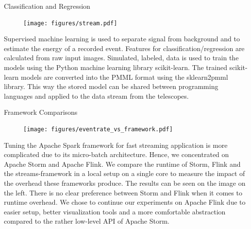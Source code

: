 \begin{multicols}{2}
    \begin{block}[]{Classification and Regression}%
      \begin{multicols}{2}
          \begin{figure}
            \texttt{[image: figures/stream.pdf]}\\
          \end{figure}
        \columnbreak
        Supervised machine learning is used to separate signal from background and to estimate
        the energy of a recorded event. Features for classification/regression are calculated from raw input
        images.
        Simulated, labeled, data is used to train the models using the Python machine learning library scikit-learn\cite{sklearn}.
        The trained scikit-learn models are converted into the PMML\cite{pmml} format using the sklearn2pmml\cite{sklearn2pmml} library.
        This way the stored model can be shared
        between programming languages and applied to the data stream from the telescopes.
      \end{multicols}
    \end{block}%

    \begin{block}[]{Framework Comparisons}%
      \begin{multicols}{2}
        \begin{figure}
          \texttt{[image: figures/eventrate\_vs\_framework.pdf]}\\
        \end{figure}
        \columnbreak
        Tuning the Apache Spark framework for fast streaming application is more complicated due to its micro-batch architecture.
        Hence, we concentrated on Apache Storm\cite{storm} and Apache Flink\cite{flink}. We compare the runtime of Storm, Flink and the streams-framework\cite{streams} in
        a local setup on a single core to measure the impact of the overhead these frameworks produce.
        The results can be seen on the image on the left.
        There is no clear preference between Storm and Flink when it comes to runtime overhead. We chose to continue our experiments on
        Apache Flink due to easier setup, better visualization tools and a more comfortable abstraction compared to the rather low-level
        API of Apache Storm.
      \end{multicols}
    \end{block}%


\end{multicols}
